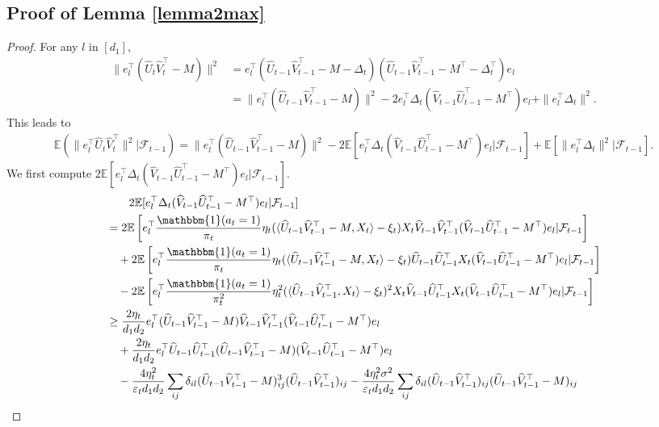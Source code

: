 \documentclass[12pt]{article}
\newcommand{\inp}[2]{\langle #1,#2\rangle}
\def\EE{{\mathbb E}}
\theoremstyle{plain}
\begin{document}
\subsection{Proof of Lemma \ref{lemma2max}}
\begin{proof}
    For any $l$ in $[d_1]$,
\begin{align*}
    \|e_l^{\top}(\widehat{U}_t\widehat{V}_t^{\top}-M)\|^2 &= e_l^{\top} (\widehat{U}_{t-1}\widehat{V}_{t-1}^{\top}-M-\Delta_{t})(\widehat{U}_{t-1}\widehat{V}_{t-1}^{\top} - M^{\top} - \Delta_{t}^{\top})e_l \\
    &= \|e_l^{\top}(\widehat{U}_{t-1}\widehat{V}_{t-1}^{\top} - M)\|^2 - 2e_l^{\top}\Delta_{t}(\widehat{V}_{t-1}\widehat{U}_{t-1}^{\top}-M^{\top})e_l + \|e_l^{\top}\Delta_{t}\|^2.
\end{align*}
This leads to
\begin{align*}
    \EE(\|e_l^{\top}\widehat{U}_t\widehat{V}_t^{\top}\|^2|\mathcal{F}_{t-1})= \|e_l^{\top}(\widehat{U}_{t-1}\widehat{V}_{t-1}^{\top}-M)\|^2 - 2\EE[e_l^{\top}\Delta_{t}(\widehat{V}_{t-1}\widehat{U}_{t-1}^{\top}-M^{\top})e_l|\mathcal{F}_{t-1}] + \EE[\|e_l^{\top}\Delta_{t}\|^2|\mathcal{F}_{t-1}].
\end{align*}
We first compute $2\EE[e_l^{\top}\Delta_{t}(\widehat{V}_{t-1}\widehat{U}_{t-1}^{\top}-M^{\top})e_l|\mathcal{F}_{t-1}]$.
\begin{align*}
    &\quad \quad 2\EE[e_l^{\top}\Delta_{t}(\widehat{V}_{t-1}\widehat{U}_{t-1}^{\top} - M^{\top})e_l|\mathcal{F}_{t-1}] \\
    &= 2\EE\left[e_l^{\top} \frac{\mathbbm{1}(a_t=1)}{\pi_t}\eta_t(\inp{\widehat{U}_{t-1}\widehat{V}_{t-1}^{\top} - M}{X_t}-\xi_t)X_t\widehat{V}_{t-1}\widehat{V}_{t-1}^{\top} (\widehat{V}_{t-1}\widehat{U}_{t-1}^{\top}-M^{\top})e_l|\mathcal{F}_{t-1}\right] \\ &\quad + 2\EE\left[e_l^{\top} \frac{\mathbbm{1}(a_t=1)}{\pi_t}\eta_t(\inp{\widehat{U}_{t-1}\widehat{V}_{t-1}^{\top}- M}{X_t}-\xi_t)\widehat{U}_{t-1}\widehat{U}_{t-1}^{\top}X_t (\widehat{V}_{t-1}\widehat{U}_{t-1}^{\top}-M^{\top})e_l|\mathcal{F}_{t-1}\right] \\ &\quad - 2\EE\left[e_l^{\top} \frac{\mathbbm{1}(a_t=1)}{\pi_t^2}\eta_t^2(\inp{\widehat{U}_{t-1}\widehat{V}_{t-1}^{\top}}{X_t}-\xi_t)^2X_t\widehat{V}_{t-1}\widehat{U}_{t-1}^{\top}X_t (\widehat{V}_{t-1}\widehat{U}_{t-1}^{\top}-M^{\top})e_l|\mathcal{F}_{t-1}\right] \\
    &\geq \frac{2\eta_t}{d_1d_2}e_l^{\top}(\widehat{U}_{t-1}\widehat{V}_{t-1}^{\top} - M)\widehat{V}_{t-1}\widehat{V}_{t-1}^{\top}(\widehat{V}_{t-1}\widehat{U}_{t-1}^{\top}-M^{\top})e_l \\ &\quad + \frac{2\eta_t}{d_1d_2}e_l^{\top}\widehat{U}_{t-1}\widehat{U}_{t-1}^{\top}(\widehat{U}_{t-1}\widehat{V}_{t-1}^{\top} - M)(\widehat{V}_{t-1}\widehat{U}_{t-1}^{\top}-M^{\top})e_l \\ &\quad - \frac{4\eta_t^2}{\varepsilon_t d_1d_2}\sum_{ij}\delta_{il}(\widehat{U}_{t-1}\widehat{V}_{t-1}^{\top} - M)_{ij}^3(\widehat{U}_{t-1}\widehat{V}_{t-1}^{\top})_{ij} - \frac{4\eta_t^2\sigma^2}{\varepsilon_t d_1d_2}\sum_{ij}\delta_{il}(\widehat{U}_{t-1}\widehat{V}_{t-1}^{\top})_{ij}(\widehat{U}_{t-1}\widehat{V}_{t-1}^{\top} - M)_{ij} \\

\end{align*}
\end{proof}
\end{document}
